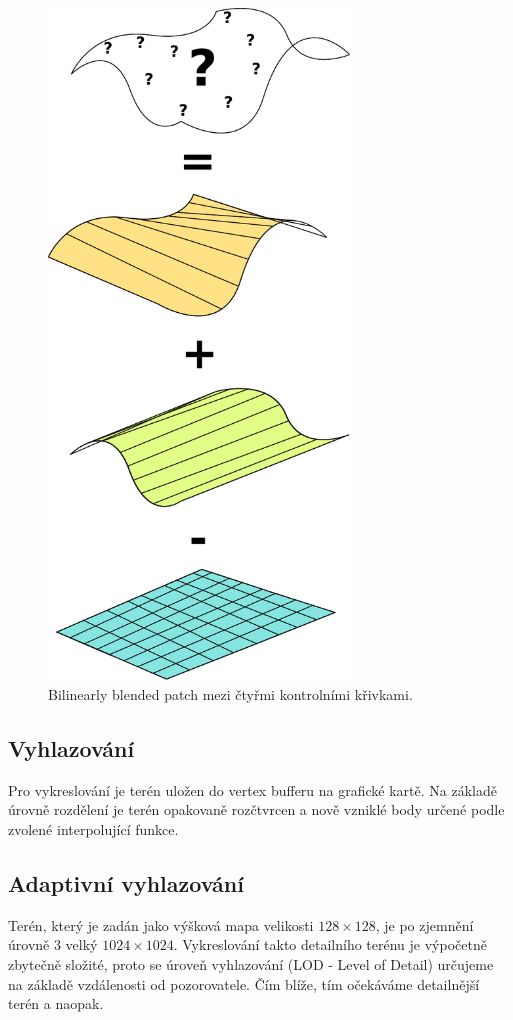 \documentclass{zcu_sp}
\begin{document}
\begin{figure}[ht!]
\centering
	\includegraphics[width=8cm]{coons.pdf}
	\caption{Bilinearly blended patch mezi čtyřmi kontrolními křivkami.}
\end{figure}


\subsection{Vyhlazování}
Pro vykreslování je terén uložen do vertex bufferu na grafické kartě. Na
základě úrovně rozdělení je terén opakovaně rozčtvrcen a nově vzniklé body
určené podle zvolené interpolující funkce.


\subsection{Adaptivní vyhlazování}
Terén, který je zadán jako výšková mapa velikosti $128\times128$, je po
zjemnění úrovně 3 velký $1024\times1024$. Vykreslování takto detailního terénu
je výpočetně zbytečně složité, proto se úroveň vyhlazování (LOD - Level of
Detail) určujeme na základě vzdálenosti od pozorovatele. Čím blíže, tím
očekáváme detailnější terén a naopak. 
\end{document}
